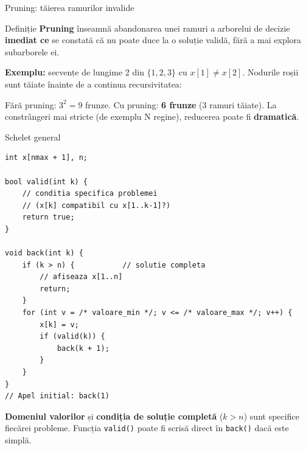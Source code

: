 \documentclass[8pt,mathserif]{beamer}
\begin{document}
\begin{frame}{Pruning: tăierea ramurilor invalide}
  \begin{block}{Definiție}
    \textbf{Pruning} înseamnă abandonarea unei ramuri a arborelui de decizie \textbf{imediat ce} se constată că nu poate duce la o soluție validă, fără a mai explora subarborele ei.
  \end{block}
  \smallskip
  \textbf{Exemplu:} secvențe de lungime 2 din $\{1,2,3\}$ cu $x[1] \neq x[2]$. Nodurile roșii sunt tăiate înainte de a continua recursivitatea:
  \begin{center}
  \end{center}
  Fără pruning: $3^2 = 9$ frunze. Cu pruning: \textbf{6 frunze} (3 ramuri tăiate). La constrângeri mai stricte (de exemplu N regine), reducerea poate fi \textbf{dramatică}.
\end{frame}

\begin{frame}[fragile]{Schelet general}
  \begin{lstlisting}
int x[nmax + 1], n;

bool valid(int k) {
    // conditia specifica problemei
    // (x[k] compatibil cu x[1..k-1]?)
    return true;
}

void back(int k) {
    if (k > n) {           // solutie completa
        // afiseaza x[1..n]
        return;
    }
    for (int v = /* valoare_min */; v <= /* valoare_max */; v++) {
        x[k] = v;
        if (valid(k)) {
            back(k + 1);
        }
    }
}
// Apel initial: back(1)
  \end{lstlisting}
  \textbf{Domeniul valorilor} și \textbf{condiția de soluție completă} ($k > n$) sunt specifice fiecărei probleme. Funcția \texttt{valid()} poate fi scrisă direct în \texttt{back()} dacă este simplă.
\end{frame}
\end{document}

